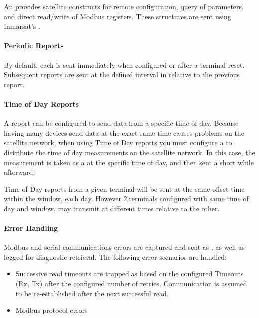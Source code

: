 \documentclass[letterpaper,10pt,english]{sphinxmanual}
\begin{document}
An  provides satellite  constructs for remote configuration, query of parameters, and direct read/write of Modbus registers.
These  structures are sent using Inmarsat’s .


\paragraph{Periodic Reports}
\label{\detokenize{funcspec:periodic-reports}}
By default, each  is sent immediately when configured or after a terminal reset.  Subsequent reports are sent at the defined interval in  relative to the previous report.


\paragraph{Time of Day Reports}
\label{\detokenize{funcspec:time-of-day-reports}}
A report can be  configured to send data from a specific time of day.
Because having many devices send data at the exact same time causes problems on the satellite network, when using Time of Day reports you must configure a  to distribute the time of day measurements on the satellite network.
In this case, the measurement is taken as a  at the specific time of day, and then sent a short while afterward.

Time of Day reports from a given terminal will be sent at the same offset time within the window, each day.  However 2 terminals configured with same time of day and window, may transmit at different times relative to the other.


\paragraph{Error Handling}
\label{\detokenize{funcspec:error-handling}}
Modbus and serial communications errors are captured and sent as {\hyperref[\detokenize{otaapi:error}]{}}, as well as logged for diagnostic retrieval.  The following error scenarios are handled:
\begin{itemize}
\item {} 
Successive read timeouts are trapped as  based on the configured Timeouts (Rx, Tx) after the configured number of retries.
Communication is assumed to be re-established after the next successful read.

\item {} 
Modbus protocol errors

\end{itemize}
\end{document}
